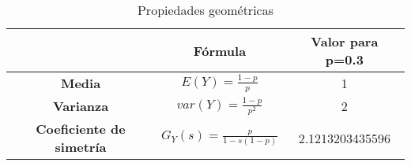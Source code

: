 
\begin{table}[H]
\begin{center}
\begin{tabular}{|c|c|c|}
\hline
   \rowcolor[RGB]{0,88,147}    & \textbf{F\'ormula}              & \textbf{Valor para p=0.3} \\ \hline
\textbf{Media} &$E(Y)=\frac{1-p}{p}$ & 1\\ \hline
\textbf{Varianza} & $var(Y)=\frac{1-p}{p^2}$ &2\\ \hline
\textbf{Coeficiente de simetr\'ia} & $G_Y(s)=\frac{p}{1-s(1-p)}$ & 2.1213203435596 \\
\hline
\end{tabular}
\end{center}
\caption{Propiedades geom\'etricas}
\label{tabla}
\end{table}

